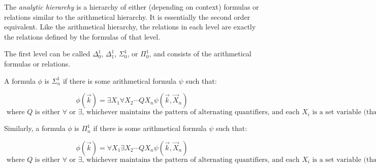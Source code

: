 \documentclass[12pt]{article}
\begin{document}
The \emph{analytic hierarchy} is a hierarchy of either (depending on context) formulas or relations similar to the arithmetical hierarchy.  It is essentially the second order equivalent.  Like the arithmetical hierarchy, the relations in each level are exactly the relations defined by the formulas of that level.

The first level can be called $\Delta^1_0$, $\Delta^1_1$, $\Sigma^1_0$, or $\Pi^1_0$, and consists of the arithmetical formulas or relations.

A formula $\phi$ is $\Sigma^1_n$ if there is some arithmetical formula $\psi$ such that:

$$\phi(\vec k)=\exists X_1\forall X_2\cdots Q X_n\psi(\vec k,\vec X_n)$$
$$\text{ where }Q\text{ is either }\forall\text{ or }\exists\text{, whichever maintains the pattern of alternating quantifiers, and each } X_i \text{ is a set variable (that is, second order)}
$$

Similarly, a formula $\phi$ is $\Pi^1_n$ if there is some arithmetical formula $\psi$ such that:

$$\phi(\vec k)=\forall X_1\exists X_2\cdots Q X_n\psi(\vec k,\vec X_n)$$
$$\text{ where }Q\text{ is either }\forall\text{ or }\exists\text{, whichever maintains the pattern of alternating quantifiers, and each } X_i \text{ is a set variable (that is, second order)}
$$
\end{document}
